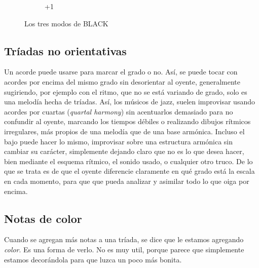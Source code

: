 \documentclass[]{report}
\begin{document}
\begin{figure}[H]
\begin{subfigure}{0.3\textwidth}
		\caption{\textsf{+1}}

	\end{subfigure}
	\caption{Los tres modos de \textsf{BLACK}}\label{fig:the-black-modes}
\end{figure}



\subsection{Tríadas no orientativas}

Un acorde puede usarse para marcar el grado o no. Así, se puede tocar con acordes por encima del mismo grado sin desorientar al oyente, generalmente sugiriendo, por ejemplo con el ritmo, que no se está variando de grado, solo es una melodía hecha de tríadas. Así, los músicos de jazz, suelen improvisar usando acordes por cuartas (\emph{quartal harmony}) sin acentuarlos demasiado para no confundir al oyente, marcando los tiempos débiles o realizando dibujos rítmicos irregulares, más propios de una melodía que de una base armónica. Incluso el bajo puede hacer lo mismo, improvisar sobre una estructura armónica sin cambiar su carácter, simplemente dejando claro que no es lo que desea hacer, bien mediante el esquema rítmico, el sonido usado, o cualquier otro truco. De lo que se trata es de que el oyente diferencie claramente en qué grado está la escala en cada momento, para que que pueda analizar y asimilar todo lo que oiga por encima.

\subsection{Notas de color}

Cuando se agregan más notas a una tríada, se dice que le estamos agregando \emph{color}. Es una forma de verlo. No es muy util, porque parece que simplemente estamos decorándola para que luzca un poco más bonita.
\end{document}

